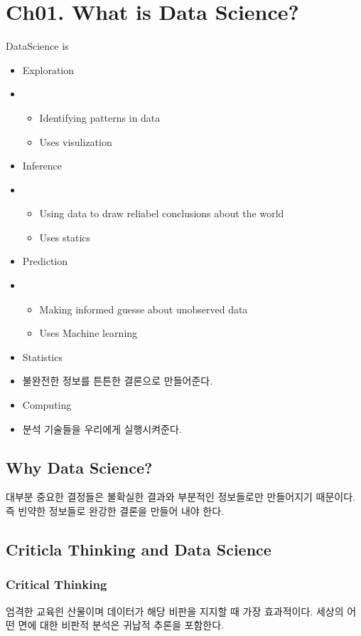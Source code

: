 \documentclass[../Data_Science.tex]{subfiles}
\begin{document}
\section{Ch01. What is Data Science?}\label{sec:Ch01. What is Data Science?}

DataScience is 
\begin{itemize}
    \item Exploration
    \item \begin{itemize}
              \item Identifying patterns in data
              \item Uses visulization
    \end{itemize}
    \item Inference
    \item \begin{itemize}
              \item Using data to draw reliabel conclusions about the world
              \item Uses statics
    \end{itemize}
    \item Prediction
    \item \begin{itemize}
              \item Making informed guesse about unobserved data
              \item Uses Machine learning
    \end{itemize}
    \item Statistics
    \item  [] 불완전한 정보를 튼튼한 결론으로 만들어준다.
    \item Computing
    \item [] 분석 기술들을 우리에게 실행시켜준다.
\end{itemize}
\subsection{Why Data Science?}\label{subsec:Why Data Science?}
대부분 중요한 결정들은 불확실한 결과와 부분적인 정보들로만 만들어지기 때문이다. 즉 빈약한 정보들로 완강한 결론을 만들어 내야 한다.

\subsection{Criticla Thinking and Data Science}\label{subsec:Criticla Thinking and Data Science}
\subsubsection{Critical Thinking}\label{subsubsec:Critical Thinking}
엄격한 교육읜 산물이며 데이터가 해당 비판을 지지할 때 가장 효과적이다. 세상의 어떤 면에 대한 비판적 분석은 귀납적 추론을 포함한다.
\end{document}

